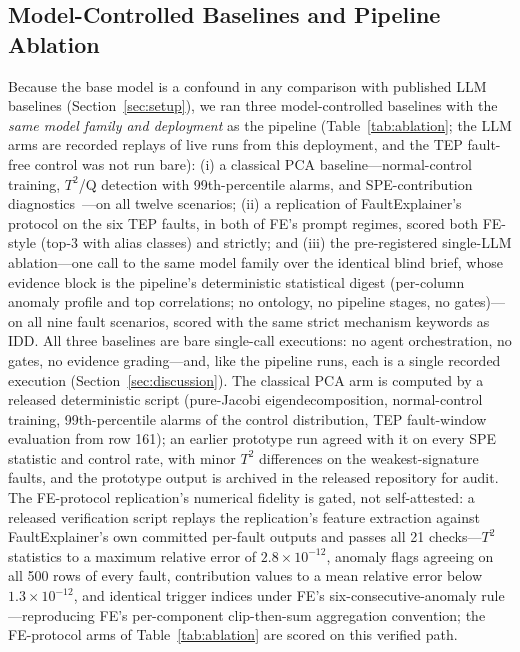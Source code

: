 \documentclass[preprint,12pt]{elsarticle}
\begin{document}
\subsection{Model-Controlled Baselines and Pipeline Ablation}\label{sec:ablation}
Because the base model is a confound in any comparison with published LLM baselines (Section~\ref{sec:setup}), we ran three model-controlled baselines with the \emph{same model family and deployment} as the pipeline (Table~\ref{tab:ablation}; the LLM arms are recorded replays of live runs from this deployment, and the TEP fault-free control was not run bare): (i) a classical PCA baseline---normal-control training, $T^2$/Q detection with 99th-percentile alarms, and SPE-contribution diagnostics~\cite{chiang2001fault,qin2012survey}---on all twelve scenarios; (ii) a replication of FaultExplainer's protocol on the six TEP faults, in both of FE's prompt regimes, scored both FE-style (top-3 with alias classes) and strictly; and (iii) the pre-registered single-LLM ablation---one call to the same model family over the identical blind brief, whose evidence block is the pipeline's deterministic statistical digest (per-column anomaly profile and top correlations; no ontology, no pipeline stages, no gates)---on all nine fault scenarios, scored with the same strict mechanism keywords as IDD. All three baselines are bare single-call executions: no agent orchestration, no gates, no evidence grading---and, like the pipeline runs, each is a single recorded execution (Section~\ref{sec:discussion}). The classical PCA arm is computed by a released deterministic script (pure-Jacobi eigendecomposition, normal-control training, 99th-percentile alarms of the control distribution, TEP fault-window evaluation from row 161); an earlier prototype run agreed with it on every SPE statistic and control rate, with minor $T^2$ differences on the weakest-signature faults, and the prototype output is archived in the released repository for audit. The FE-protocol replication's numerical fidelity is gated, not self-attested: a released verification script replays the replication's feature extraction against FaultExplainer's own committed per-fault outputs and passes all 21 checks---$T^2$ statistics to a maximum relative error of $2.8{\times}10^{-12}$, anomaly flags agreeing on all 500 rows of every fault, contribution values to a mean relative error below $1.3{\times}10^{-12}$, and identical trigger indices under FE's six-consecutive-anomaly rule---reproducing FE's per-component clip-then-sum aggregation convention; the FE-protocol arms of Table~\ref{tab:ablation} are scored on this verified path.
\end{document}

